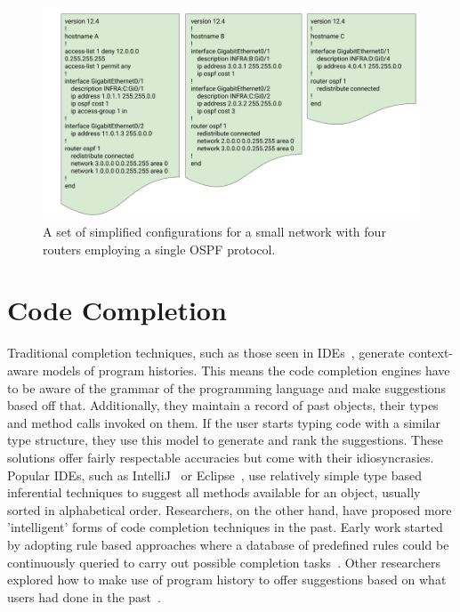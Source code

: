 \documentclass[../thesis.tex]{subfiles}
\begin{document}
\begin{figure}[H]
	\centering
	\includegraphics[width=5in]{configs-redone.png}
	\caption{A set of simplified configurations for a small network with four routers employing a single OSPF protocol.}
\end{figure}

\section{Code Completion}

Traditional completion techniques, such as those seen in IDEs~\cite{intelliJ-completion}, generate context-aware models of program histories. This means the code completion engines have to be aware of the grammar of the programming language and make suggestions based off that. Additionally, they maintain a record of past objects, their types and method calls invoked on them. If the user starts typing code with a similar type structure, they use this model to generate and rank the suggestions. These solutions offer fairly respectable accuracies but come with their idiosyncrasies. Popular IDEs, such as IntelliJ~\cite{intelliJ} or Eclipse~\cite{eclipse}, use relatively simple type based inferential techniques to suggest all methods available for an object, usually sorted in alphabetical order. Researchers, on the other hand, have proposed more 'intelligent' forms of code completion techniques in the past. Early work started by adopting rule based approaches where a database of predefined rules could be continuously queried to carry out possible completion tasks~\cite{kaiser}.  Other researchers explored how to make use of program history to offer suggestions based on what users had done in the past~\cite{robbes}.\\  
\end{document}
